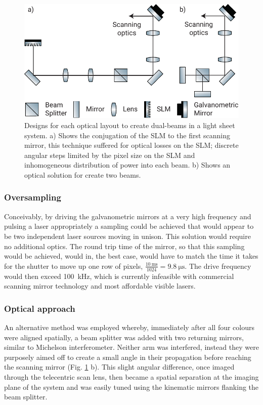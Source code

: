 \begin{figure}
  \centering
  \includegraphics{dual_beam_layouts}
  \caption{Designs for each optical layout to create dual-beams in a light sheet system.
  a) Shows the conjugation of the SLM to the first scanning mirror, this technique suffered for optical losses on the SLM; discrete angular steps limited by the pixel size on the SLM and inhomogeneous distribution of power into each beam.
  b) Shows an optical solution for create two beams.
  }
  \label{fig:dual_beam_layouts}
\end{figure}

\subsubsection{Oversampling}
Conceivably, by driving the galvanometric mirrors at a very high frequency and pulsing a laser appropriately a sampling could be achieved that would appear to be two independent laser sources moving in unison.
This solution would require no additional optics.
The round trip time of the mirror, so that this sampling would be achieved, would in, the best case, would have to match the time it takes for the shutter to move up one row of pixels, $\frac{\SI{10}{\milli\second}}{1024}=\SI{9.8}{\micro\second}$.
The drive frequency would then exceed \SI{100}{\kilo\hertz}, which is currently infeasible with commercial scanning mirror technology and most affordable visible lasers.

\subsubsection{Optical approach}
An alternative method was employed whereby, immediately after all four colours were aligned spatially, a beam splitter was added with two returning mirrors, similar to Michelson interferometer.
Neither arm was interfered, instead they were purposely aimed off to create a small angle in their propagation before reaching the scanning mirror (Fig. \ref{fig:dual_beam_layouts} b).
This slight angular difference, once imaged through the telecentric scan lens, then became a spatial separation at the imaging plane of the system and was easily tuned using the kinematic mirrors flanking the beam splitter.

